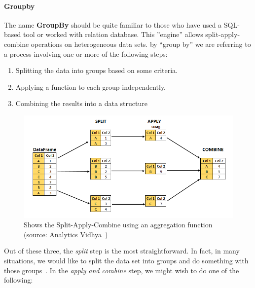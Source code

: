 \paragraph{Groupby}\label{par:groupby}
The name \textbf{GroupBy} should be quite familiar to those who have used a SQL-based tool or worked with relation database. This ''engine'' allows split-apply-combine operations on heterogeneous data sets.
by “group by” we are referring to a process involving one or more of the following steps:
\begin{enumerate}
    \item Splitting the data into groups based on some criteria.
    \item Applying a function to each group independently.
    \item Combining the results into a data structure
\end{enumerate}
\begin{figure}[ht]
    \centering
    \includegraphics[width=\textwidth]{content/chapter_3/images/split-apply-combine.png}
    \caption{Shows the Split-Apply-Combine using an aggregation function (source: Analytics Vidhya~\cite{Misc:pandey_split-apply-combine})}\label{fig:pandas_groupby}
\end{figure}
Out of these three, the \textit{split} step is the most straightforward. In fact, in many situations, we would like to split the data set into groups and do something with those groups~\cite{reback_pandas-dev/pandas:_2022}.
In the \textit{apply and combine} step, we might wish to do one of the following:
